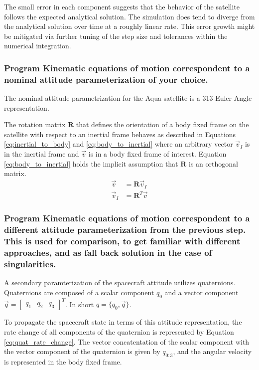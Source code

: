 The small error in each component suggests that the behavior of the satellite follows the expected analytical solution. The simulation does tend to diverge from the analytical solution over time at a roughly linear rate. This error growth might be mitigated via further tuning of the step size and tolerances within the numerical integration.

\subsubsection{Program Kinematic equations of motion correspondent to a nominal attitude parameterization of your choice.}

The nominal attitude parametrization for the Aqua satellite is a 313 Euler Angle representation. 

The rotation matrix $\boldsymbol{R}$ that defines the orientation of a body fixed frame on the satellite with respect to an inertial frame behaves as described in Equations \ref{eq:inertial_to_body} and \ref{eq:body_to_inertial} where an arbitrary vector $\vec{v}_I$ is in the inertial frame and $\vec{v}$ is in a body fixed frame of interest. Equation \ref{eq:body_to_inertial} holds the implicit assumption that $\boldsymbol{R}$ is an orthogonal matrix. 
\begin{eqnarray}
    \vec{v} &= \boldsymbol{R} \vec{v}_I \label{eq:inertial_to_body} \\
    \vec{v}_I &= \boldsymbol{R}^T \vec{v} \label{eq:body_to_inertial}
\end{eqnarray}
\subsubsection{Program Kinematic equations of motion correspondent to a different attitude parameterization from the previous step. This is used for comparison, to get familiar with different approaches, and as fall back solution in the case of singularities.}

A secondary paramterization of the spacecraft attitude utilizes quaternions. Quaternions are composed of a scalar component $q_0$ and a vector component $\vec{q} = \begin{bmatrix}  q_1 & q_2 & q_3  \end{bmatrix}^T$. In short $q = \{q_0, \vec{q}\}$. 

To propagate the spacecraft state in terms of this attitude representation, the rate change of all components of the quaternion is represented by Equation \ref{eq:quat_rate_change}. The vector concatentation of the scalar component with the vector component of the quaternion is given by $q_{0:3}$, and the angular velocity is represented in the body fixed frame.

